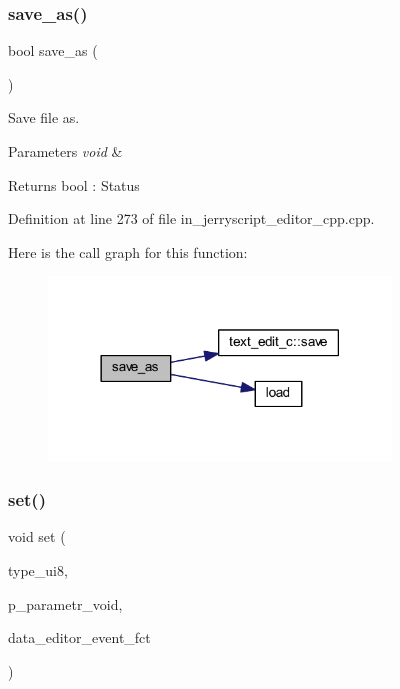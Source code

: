 \subsubsection{save\_as()}
{\footnotesize\ttfamily bool save\+\_\+as (\begin{DoxyParamCaption}\item[{void}]{ }\end{DoxyParamCaption})}



Save file as. 


\begin{DoxyParams}{Parameters}
{\em void} & \\
\hline
\end{DoxyParams}
\begin{DoxyReturn}{Returns}
bool \+: Status 
\end{DoxyReturn}


Definition at line 273 of file in\+\_\+jerryscript\+\_\+editor\+\_\+cpp.\+cpp.

Here is the call graph for this function\+:
\nopagebreak
\begin{figure}[H]
\begin{center}
\leavevmode
\includegraphics[width=258pt]{group___editor_gafc875a0c47eb079e45aae60a3fea6296_cgraph}
\end{center}
\end{figure}
\mbox{\label{group___editor_ga9436732644f96b2f9ebe50c7682d775e}} 
\subsubsection{set()}
{\footnotesize\ttfamily void set (\begin{DoxyParamCaption}\item[{uint8\+\_\+t}]{type\+\_\+ui8,  }\item[{void $\ast$}]{p\+\_\+parametr\+\_\+void,  }\item[{\textbf{ editor\+\_\+event\+\_\+fct}}]{data\+\_\+editor\+\_\+event\+\_\+fct }\end{DoxyParamCaption})}



